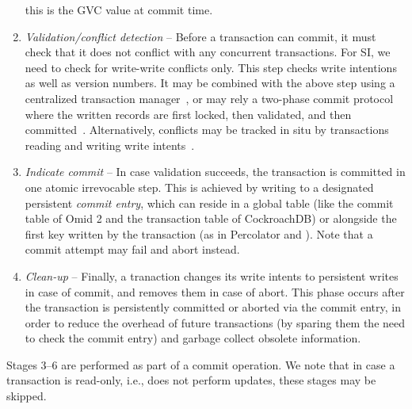 \begin{enumerate}
  this is the GVC value at commit time. 
   \item \emph{Validation/conflict detection} -- Before a transaction can commit, it must check that it does not conflict with any 
  concurrent transactions.  For SI, we need to check for write-write conflicts only. 
  This step checks write intentions as well as version numbers. It may be combined  with the above step using a centralized 
  transaction manager~\cite{OmidICDE2014,tephra,omid-blog}, or may rely a two-phase commit protocol where the written records are first 
  locked, then validated, and then committed~\cite{Percolator2010}. 
  Alternatively, conflicts may be tracked in situ   by transactions   reading and writing write intents~\cite{cockroach}.
  \item \emph{Indicate commit} --  In case validation succeeds, the transaction is committed 
  in one atomic irrevocable  step. This is achieved by writing to a designated persistent \emph{commit entry}, 
  which can reside in a global table (like the commit table of 
  Omid 2 and the transaction table of CockroachDB) or alongside the first  key written by 
  the transaction (as in Percolator and \sys).  Note that a commit attempt may fail and abort instead. 
  \item \emph{Clean-up} -- Finally, a tranaction changes its write intents to
  persistent writes in case of commit, and removes them in case of abort. This
  phase occurs after the transaction is persistently committed or aborted via the commit entry, in
  order to reduce the overhead of future transactions (by sparing them the need to check the commit entry)
  and garbage collect   obsolete information. 
\end{enumerate}

Stages 3--6 are performed as part of a commit operation. 
We note that in case a transaction is read-only, i.e., does not perform updates, these stages may be skipped.

 